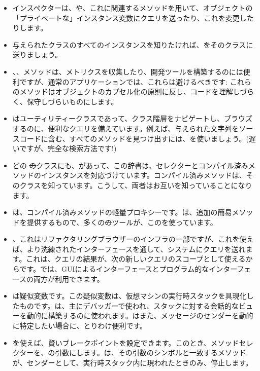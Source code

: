 \documentclass[a4paper,10pt,twoside]{book}
\begin{document}
\begin{itemize}
\item インスペクターは、や、これに関連するメソッドを用いて、オブジェクトの「プライベートな」インスタンス変数にクエリを送ったり、これを変更したりします。
\item 与えられたクラスのすべてのインスタンスを知りたければ、をそのクラスに送りましょう。
\item {}、、\etc メソッドは、メトリクスを収集したり、開発ツールを構築するのには便利ですが、通常のアプリケーションでは、これらは避けるべきです: これらのメソッドはオブジェクトのカプセル化の原則に反し、コードを理解しづらく、保守しづらいものにします。
\item {}はユーティリティークラスであって、クラス階層をナビゲートし、ブラウズするのに、便利なクエリを備えています。例えば、与えられた文字列をソースコードに含む、すべてのメソッドを見つけ出すには、を使いましょう。(遅いですが、完全な検索方法です!)
\item どの \st のクラスにも、があって、この辞書は、セレクターとコンパイル済みメソッドのインスタンスを対応づけています。コンパイル済みメソッドは、そのクラスを知っています。こうして、両者はお互いを知っていることになります。
\item {}は、コンパイル済みメソッドの軽量プロキシーです。は、追加の簡易メソッドを提供するもので、多くの\st のツールが、このを使っています。
\item {}、これはリファクタリングブラウザーのインフラの一部ですが、これを使えば、より洗練されたインターフェースを通して、システムにクエリを送れます。これは、クエリの結果が、次の新しいクエリのスコープとして使えるからです。では、GUIによるインターフェースとプログラム的なインターフェースの両方が利用できます。
\item {}は疑似変数です。この疑似変数は、仮想マシンの実行時スタックを具現化したものです。は、主にデバッガーで使われ、スタックに対する会話的なビューを動的に構築するのに使われます。はまた、メッセージのセンダーを動的に特定したい場合に、とりわけ便利です。
\item {}を使えば、賢いブレークポイントを設定できます。このとき、メソッドセレクターを、の引数にします。は、その引数のシンボルと一致するメソッドが、センダーとして、実行時スタック内に現われたときのみ、停止します。

\end{itemize}
\end{document}
